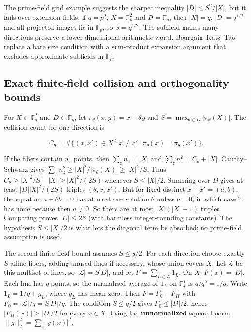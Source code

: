 The prime-field grid example suggests the sharper inequality \(|D|\lesssim S^2/|X|\), but it fails over extension fields: if \(q=p^2\), \(X=\mathbb F_p^2\) and \(D=\mathbb F_p\), then \(|X|=q\), \(|D|=q^{1/2}\) and all projected images lie in \(\mathbb F_p\), so \(S=q^{1/2}\). The subfield makes many directions preserve a lower-dimensional arithmetic world. Bourgain--Katz--Tao replace a bare size condition with a sum-product expansion argument that excludes approximate subfields in \(\mathbb F_p\).

\subsection{Exact finite-field collision and orthogonality bounds}\label{04-visual-computing-ii-ch032-exact-finite-field-collision-and-orthogonality-bounds}

For \(X\subset\mathbb F_q^2\) and \(D\subset\mathbb F_q\), let \(\pi_\theta(x,y)=x+\theta y\) and \(S=\max_{\theta\in D}|\pi_\theta(X)|\). The collision count for one direction is

\[C_\theta=\#\{(x,x')\in X^2:x\ne x',\ \pi_\theta(x)=\pi_\theta(x')\}.\]

If the fibers contain \(n_z\) points, then \(\sum_z n_z=|X|\) and \(\sum_z n_z^2=C_\theta+|X|\). Cauchy--Schwarz gives \(\sum_z n_z^2\ge |X|^2/|\pi_\theta(X)|\ge |X|^2/S\). Thus \(C_\theta\ge |X|^2/S-|X|\ge |X|^2/(2S)\) whenever \(S\le |X|/2\). Summing over \(D\) gives at least \(|D||X|^2/(2S)\) triples \((\theta,x,x')\). But for fixed distinct \(x-x'=(a,b)\), the equation \(a+\theta b=0\) has at most one solution \(\theta\) unless \(b=0\), in which case it has none because then \(a\ne0\). So there are at most \(|X|(|X|-1)\) triples. Comparing proves \(|D|\le 2S\) (with harmless integer-rounding constants). The hypothesis \(S\le |X|/2\) is what lets the diagonal term be absorbed; no prime-field assumption is used.

The second finite-field bound assumes \(S\le q/2\). For each direction choose exactly \(S\) affine fibers, adding unused lines if necessary, whose union covers \(X\). Let \(\mathcal L\) be this multiset of lines, so \(|\mathcal L|=S|D|\), and let \(F=\sum_{L\in\mathcal L}1_L\). On \(X\), \(F(x)=|D|\). Each line has \(q\) points, so the normalized average of \(1_L\) on \(\mathbb F_q^2\) is \(q/q^2=1/q\). Write \(1_L=1/q+g_L\), where \(g_L\) has mean zero. Then \(F=F_0+F_H\) with \(F_0=|\mathcal L|/q=S|D|/q\). The condition \(S\le q/2\) gives \(F_0\le |D|/2\), hence \(|F_H(x)|\ge |D|/2\) for every \(x\in X\). Using the \textbf{unnormalized} squared norm \(\|g\|_2^2=\sum_x|g(x)|^2\),

